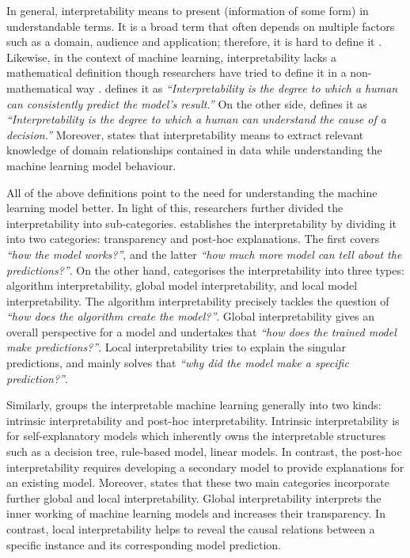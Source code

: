 \documentclass[english]{tktltiki2}
\theoremstyle{definition}
\theoremstyle{remark}
\begin{document}
In general, interpretability means to present (information of some form) in understandable terms. It is a broad term that often depends on multiple factors such as a domain, audience and application; therefore, it is hard to define it \citep{ruping2006learning, kim2016examples, miller2018explanation, molnarinterpretable, murdoch2019interpretable}. Likewise, in the context of machine learning, interpretability lacks a mathematical definition though researchers have tried to define it in a non-mathematical way \citep{molnarinterpretable}. \citet{kim2016examples} defines it as \textit{“Interpretability is the degree to which a human can consistently predict the model’s result.”}  On the other side, \citet{miller2018explanation} defines it as \textit{“Interpretability is the degree to which a human can understand the cause of a decision.”} Moreover, \citet{murdoch2019interpretable} states that interpretability means to extract relevant knowledge of domain relationships contained in data while understanding the machine learning model behaviour. 

All of the above definitions point to the need for understanding the machine learning model better. In light of this, researchers further divided the interpretability into sub-categories. \citet{lipton2016mythos} establishes the interpretability by dividing it into two categories: transparency and post-hoc explanations. The first covers \textit{“how the model works?”}, and the latter \textit{“how much more model can tell about the predictions?”}. On the other hand, \citet{molnarinterpretable} categorises the interpretability into three types: algorithm interpretability, global model interpretability, and local model interpretability. The algorithm interpretability precisely tackles the question of \textit{“how does the algorithm create the model?”}. Global interpretability gives an overall perspective for a model and undertakes that \textit{“how does the trained model make predictions?”}.  Local interpretability tries to explain the singular predictions, and mainly solves that \textit{“why did the model make a specific prediction?”}.

Similarly, \citet{murdoch2019interpretable} groups the interpretable machine learning generally into two kinds: intrinsic interpretability and post-hoc interpretability. Intrinsic interpretability is for self-explanatory models which inherently owns the interpretable structures such as a decision tree, rule-based model, linear models. In contrast, the post-hoc interpretability requires developing a secondary model to provide explanations for an existing model. Moreover, \citet{murdoch2019interpretable} states that these two main categories incorporate further global and local interpretability. Global interpretability interprets the inner working of machine learning models and increases their transparency. In contrast,  local interpretability helps to reveal the causal relations between a specific instance and its corresponding model prediction.
\end{document}
